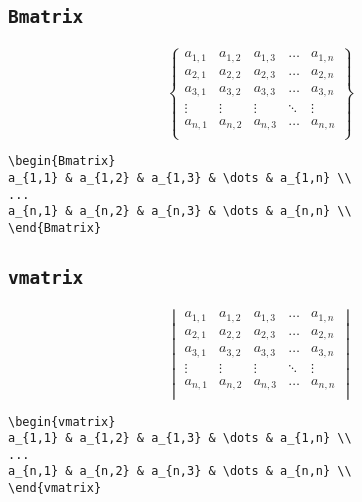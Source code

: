 \subsection{\texttt{Bmatrix}}

\begin{equation*}
\begin{Bmatrix}
a_{1,1} & a_{1,2} & a_{1,3} & \dots & a_{1,n} \\
a_{2,1} & a_{2,2} & a_{2,3} & \dots & a_{2,n} \\
a_{3,1} & a_{3,2} & a_{3,3} & \dots & a_{3,n} \\
\vdots & \vdots & \vdots & \ddots & \vdots \\
a_{n,1} & a_{n,2} & a_{n,3} & \dots & a_{n,n} \\
\end{Bmatrix}
\end{equation*}
\begin{verbatim}
\begin{Bmatrix}
a_{1,1} & a_{1,2} & a_{1,3} & \dots & a_{1,n} \\
...
a_{n,1} & a_{n,2} & a_{n,3} & \dots & a_{n,n} \\
\end{Bmatrix}
\end{verbatim}

\subsection{\texttt{vmatrix}}

\begin{equation*}
\begin{vmatrix}
a_{1,1} & a_{1,2} & a_{1,3} & \dots & a_{1,n} \\
a_{2,1} & a_{2,2} & a_{2,3} & \dots & a_{2,n} \\
a_{3,1} & a_{3,2} & a_{3,3} & \dots & a_{3,n} \\
\vdots & \vdots & \vdots & \ddots & \vdots \\
a_{n,1} & a_{n,2} & a_{n,3} & \dots & a_{n,n} \\
\end{vmatrix}
\end{equation*}
\begin{verbatim}
\begin{vmatrix}
a_{1,1} & a_{1,2} & a_{1,3} & \dots & a_{1,n} \\
...
a_{n,1} & a_{n,2} & a_{n,3} & \dots & a_{n,n} \\
\end{vmatrix}
\end{verbatim}

